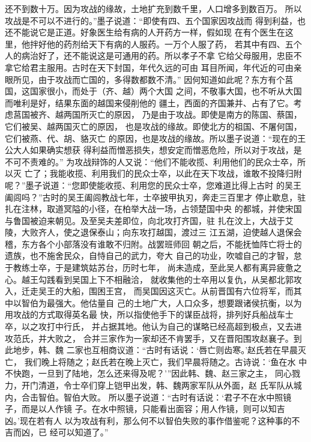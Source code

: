 \documentclass[12pt,UTF8]{ctexbook}
\begin{document}
还不到数十万。因为攻战的缘故，土地扩充到数千里，人口增多到数百万。 
所以攻战是不可以不进行的。”墨子说道：“即使有四、五个国家因攻战而 
得到利益，也还不能说它是正道。好象医生给有病的人开药方一样，假如现 
在有个医生在这里，他拌好他的药剂给天下有病的人服药。一万个人服了药， 
若其中有四、五个人的病治好了，还不能说这是可通用的药。所以孝子不拿 
它给父母服用，忠臣不拿它给君主服用。古时在天下封国，年代久远的可由 
耳目所闻，年代近的可由亲眼所见，由于攻战而亡国的，多得数都数不清。” 
因何知道如此呢？东方有个莒国，这国家很小，而处于（齐、越）两个大国 
之间，不敬事大国，也不听从大国而唯利是好，结果东面的越国来侵削他的 
疆土，西面的齐国兼并、占有了它。考虑莒国被齐、越两国所灭亡的原因， 
乃是由于攻战。即使是南方的陈国、蔡国，它们被吴、越两国灭亡的原因， 
也是攻战的缘故。即使北方的柤国、不屠何国，它们被燕、代、胡、貉灭亡 
的原因，也是攻战的缘故。所以墨子说道：“现在的王公大人如果确实想获 
得利益而憎恶损失，想安定而憎恶危险，所以对于攻战，是不可不责难的。” 
为攻战辩饰的人又说：“他们不能收揽、利用他们的民众士卒，所以灭 
亡了；我能收揽、利用我们的民众士卒，以此在天下攻战，谁敢不投降归附 
呢？”墨子说道：“您即使能收揽、利用您的民众士卒，您难道比得上古时 
的吴王阖闾吗？”古时的吴王阖闾教战七年，士卒披甲执刃，奔走三百里才 
停止歇息，驻扎在注林，取道冥隘的小径，在柏举大战一场，占领楚国中央 
的都城，并使宋国与鲁国被迫来朝见。及至吴夫差即位，向北攻打齐国，驻 
扎在汶上，大战于艾陵，大败齐人，使之退保泰山；向东攻打越国，渡过三 
江五湖，迫使越人退保会稽，东方各个小部落没有谁敢不归附。战罢班师回 
朝之后，不能抚恤阵亡将士的遗族，也不施舍民众，自恃自己的武力，夸大 
自己的功业，吹嘘自己的才智，怠于教练士卒，于是建筑姑苏台，历时七年， 
尚未造成，至此吴人都有离异疲惫之心。越王勾践看到吴国上下不相融洽， 
就收集他的士卒用以复仇，从吴都北郭攻入，迁走吴王的大船，围困王宫， 
而吴国因这灭亡。从前晋国有六位将军，而其中以智伯为最强大。他估量自 
己的土地广大，人口众多，想要跟诸侯抗衡，以为用攻战的方式取得英名最 
快，所以指使他手下的谋臣战将，排列好兵船战车士卒，以之攻打中行氏， 
并占据其地。他认为自己的谋略已经高超到极点，又去进攻范氏，并大败之， 
合并三家作为一家却还不肯罢手，又在晋阳围攻赵襄子。到此地步，韩、魏 
二家也互相商议道：“古时有话说：‘唇亡则齿寒。’赵氏若在早晨灭亡， 
我们晚上将随之；赵氏若在晚上灭亡，我们早晨将随之。古诗说：‘鱼在水 
中不快跑，一旦到了陆地，怎么还来得及呢？’”因此韩、魏、赵三家之主， 
同心戮力，开门清道，令士卒们穿上铠甲出发，韩、魏两家军队从外面，赵 
氏军队从城内，合击智伯。智伯大败。 
所以墨子说道：“古时有话说：‘君子不在水中照镜子，而是以人作镜 
子。在水中照镜，只能看出面容；用人作镜，则可以知吉凶。’现在若有人 
以为攻战有利，那么何不以智伯失败的事作借鉴呢？这种事的不吉而凶，已 
经可以知道了。” 
\end{document}
